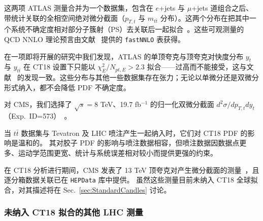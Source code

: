 这两项 ATLAS 测量合并为一个数据集，包含在 $e$+jets 与 $\mu$+jets 道组合之后、带统计关联的全相空间绝对微分截面（$p_{T,t}$ 与 $m_{t\bar{t}}$ 分布）。这两个分布在把其中一个系统不确定度相对部分子簇射（PS）去关联后一起拟合~\cite{Bogdan}。这些可观测量的 QCD NNLO 理论预言由文献~\cite{Czakon:2017dip,fastnnlo:grids} 提供的 \texttt{fastNNLO} 表获得。


在一项即将开展的研究中我们发现，ATLAS 的单顶夸克与顶夸克对快度分布 $y_t$ 与 $y_{t\bar t}$ 在 CT18 设置下只能以 $\chi^2_E/N_{pt,E}>2.3$ 拟合——过高而不能接受，这与文献~\cite{Kadir:2020yml} 的发现一致。这些分布与其他一些数据集存在张力；无论以单微分还是双微分形式纳入，都不会降低 PDF 不确定度。

对 CMS，我们选择了 $\sqrt{s}=8$ TeV、19.7 fb$^{-1}$ 的归一化双微分截面 $d^2 \sigma/dp_{T,t}dy_t$（Exp.~ID=573）~\cite{Sirunyan:2017azo}。

当 $t\bar t$ 数据集与 Tevatron 及 LHC 喷注产生一起纳入时，它们对 CT18 PDF 的影响是温和的。
其对胶子 PDF 的影响与喷注数据相容，但喷注数据因数据点更多、运动学范围更宽、统计与系统误差相对较小而提供更强的约束。

在 CT18 分析进行期间，CMS 发表了 13 TeV 顶夸克对产生微分截面的测量~\cite{Sirunyan:2018ucr}，且逐分箱数据关联已在 \texttt{HEPData} 库中提供。
虽然这些测量目前未纳入 CT18 全球拟合，对其描述将在 Sec.~\ref{sec:StandardCandles} 讨论。

\subsubsection{未纳入 CT18 拟合的其他 LHC 测量
\label{sec:DataOther}
}

